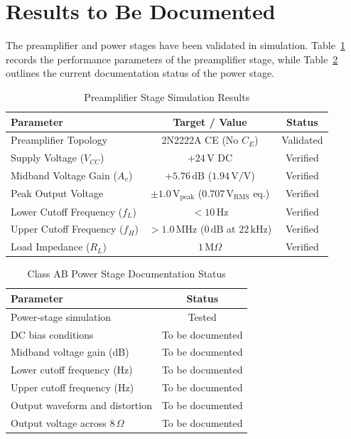 \documentclass[conference]{IEEEtran}
\begin{document}
\section{Results to Be Documented}
The preamplifier and power stages have been validated in simulation. Table~\ref{tab:preamp_results} records the performance parameters of the preamplifier stage, while Table~\ref{tab:power_status} outlines the current documentation status of the power stage.

\begin{table}[H]
\caption{Preamplifier Stage Simulation Results}
\label{tab:preamp_results}
\centering
\begin{tabular}{lcc}
\toprule
Parameter & Target / Value & Status \\
\midrule
Preamplifier Topology & 2N2222A CE (No $C_E$) & Validated \\
Supply Voltage ($V_{CC}$) & $+24\,\mathrm{V}$ DC & Verified \\
Midband Voltage Gain ($A_v$) & $+5.76\,\mathrm{dB}$ ($1.94\,\mathrm{V/V}$) & Verified \\
Peak Output Voltage & $\pm1.0\,\mathrm{V_{peak}}$ ($0.707\,\mathrm{V_{RMS}}$ eq.) & Verified \\
Lower Cutoff Frequency ($f_L$) & $<10\,\mathrm{Hz}$ & Verified \\
Upper Cutoff Frequency ($f_H$) & $>1.0\,\mathrm{MHz}$ ($0\,\mathrm{dB}$ at $22\,\mathrm{kHz}$) & Verified \\
Load Impedance ($R_L$) & $1\,\mathrm{M}\Omega$ & Verified \\
\bottomrule
\end{tabular}
\end{table}

\begin{table}[H]
\caption{Class AB Power Stage Documentation Status}
\label{tab:power_status}
\centering
\begin{tabular}{lc}
\toprule
Parameter & Status \\
\midrule
Power-stage simulation & Tested \\
DC bias conditions & To be documented \\
Midband voltage gain (dB) & To be documented \\
Lower cutoff frequency (Hz) & To be documented \\
Upper cutoff frequency (Hz) & To be documented \\
Output waveform and distortion & To be documented \\
Output voltage across $8\,\Omega$ & To be documented \\
\bottomrule
\end{tabular}
\end{table}
\end{document}
